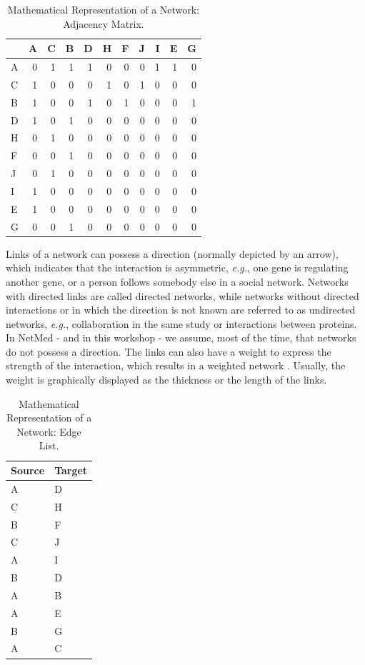\documentclass[
]{book}
\begin{document}
\begin{table}

\caption{\label{tab:ADJ}Mathematical Representation of a Network: Adjacency Matrix.}
\centering
\begin{tabular}[t]{l|r|r|r|r|r|r|r|r|r|r}
\hline
  & A & C & B & D & H & F & J & I & E & G\\
\hline
A & 0 & 1 & 1 & 1 & 0 & 0 & 0 & 1 & 1 & 0\\
\hline
C & 1 & 0 & 0 & 0 & 1 & 0 & 1 & 0 & 0 & 0\\
\hline
B & 1 & 0 & 0 & 1 & 0 & 1 & 0 & 0 & 0 & 1\\
\hline
D & 1 & 0 & 1 & 0 & 0 & 0 & 0 & 0 & 0 & 0\\
\hline
H & 0 & 1 & 0 & 0 & 0 & 0 & 0 & 0 & 0 & 0\\
\hline
F & 0 & 0 & 1 & 0 & 0 & 0 & 0 & 0 & 0 & 0\\
\hline
J & 0 & 1 & 0 & 0 & 0 & 0 & 0 & 0 & 0 & 0\\
\hline
I & 1 & 0 & 0 & 0 & 0 & 0 & 0 & 0 & 0 & 0\\
\hline
E & 1 & 0 & 0 & 0 & 0 & 0 & 0 & 0 & 0 & 0\\
\hline
G & 0 & 0 & 1 & 0 & 0 & 0 & 0 & 0 & 0 & 0\\
\hline
\end{tabular}
\end{table}

Links of a network can possess a direction (normally depicted by an arrow), which indicates that the interaction is asymmetric, \emph{e.g.}, one gene is regulating another gene, or a person follows somebody else in a social network. Networks with directed links are called directed networks, while networks without directed interactions or in which the direction is not known are referred to as undirected networks, \emph{e.g.}, collaboration in the same study or interactions between proteins. In NetMed - and in this workshop - we assume, most of the time, that networks do not possess a direction. The links can also have a weight to express the strength of the interaction, which results in a weighted network \citep{Newman2018, Barabasi2016}. Usually, the weight is graphically displayed as the thickness or the length of the links.

\begin{table}

\caption{\label{tab:EL}Mathematical Representation of a Network: Edge List.}
\centering
\begin{tabular}[t]{l|l}
\hline
Source & Target\\
\hline
A & D\\
\hline
C & H\\
\hline
B & F\\
\hline
C & J\\
\hline
A & I\\
\hline
B & D\\
\hline
A & B\\
\hline
A & E\\
\hline
B & G\\
\hline
A & C\\
\hline
\end{tabular}
\end{table}
\end{document}
